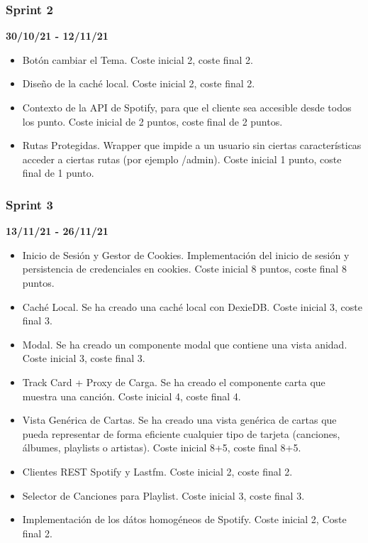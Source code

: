 \subsubsection{Sprint 2}
\textbf{30/10/21 - 12/11/21}

\begin{itemize}
    \item Botón cambiar el Tema. Coste inicial 2, coste final 2.
    \item Diseño de la caché local. Coste inicial 2, coste final 2.
    \item Contexto de la API de Spotify, para que el cliente sea accesible desde todos los punto. Coste inicial de 2 puntos, coste final de 2 puntos. 
    \item Rutas Protegidas. Wrapper que impide a un usuario sin ciertas características acceder a ciertas rutas (por ejemplo /admin). Coste inicial 1 punto, coste final de 1 punto.
\end{itemize}


\subsubsection{Sprint 3}
\textbf{13/11/21 - 26/11/21}

\begin{itemize}
    \item Inicio de Sesión y Gestor de Cookies. Implementación del inicio de sesión y persistencia de credenciales en cookies. Coste inicial 8 puntos, coste final 8 puntos. 
    \item Caché Local. Se ha creado una caché local con DexieDB. Coste inicial 3, coste final 3. 
    \item Modal. Se ha creado un componente modal que contiene una vista anidad. Coste inicial 3, coste final 3.
    \item Track Card + Proxy de Carga. Se ha creado el componente carta que muestra una canción. Coste inicial 4, coste final 4. 
    \item Vista Genérica de Cartas. Se ha creado una vista genérica de cartas que pueda representar de forma eficiente cualquier tipo de tarjeta (canciones, álbumes, playlists o artistas). Coste inicial 8+5, coste final 8+5.
    \item Clientes REST Spotify y Lastfm. Coste inicial 2, coste final 2.
    \item Selector de Canciones para Playlist. Coste inicial 3, coste final 3.
    \item Implementación de los dátos homogéneos de Spotify. Coste inicial 2, Coste final 2. 
    
\end{itemize}



